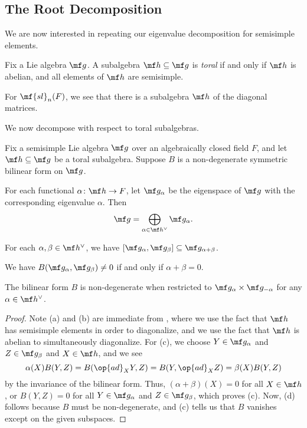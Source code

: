 \documentclass[../notes.tex]{subfiles}
\begin{document}
\subsection{The Root Decomposition}
We are now interested in repeating our eigenvalue decomposition for semisimple elements.
\begin{definition}[toral]
	Fix a Lie algebra $\mf g$. A subalgebra $\mf h\subseteq\mf g$ is \textit{toral} if and only if $\mf h$ is abelian, and all elements of $\mf h$ are semisimple.
\end{definition}
\begin{example}
	For $\mf{sl}_n(F)$, we see that there is a subalgebra $\mf h$ of the diagonal matrices.
\end{example}
We now decompose with respect to toral subalgebras.
\begin{proposition} \label{prop:toral-root-decomposition}
	Fix a semisimple Lie algebra $\mf g$ over an algebraically closed field $F$, and let $\mf h\subseteq\mf g$ be a toral subalgebra. Suppose $B$ is a non-degenerate symmetric bilinear form on $\mf g$.
	\begin{listalph}
		\item For each functional $\alpha\colon\mf h\to F$, let $\mf g_\alpha$ be the eigenspace of $\mf g$ with the corresponding eigenvalue $\alpha$. Then
		\[\mf g=\bigoplus_{\alpha\in\mf h^\lor}\mf g_\alpha.\]
		\item For each $\alpha,\beta\in\mf h^\lor$, we have $[\mf g_\alpha,\mf g_\beta]\subseteq\mf g_{\alpha+\beta}$.
		\item We have $B(\mf g_\alpha,\mf g_\beta)\ne0$ if and only if $\alpha+\beta=0$.
		\item The bilinear form $B$ is non-degenerate when restricted to $\mf g_\alpha\times\mf g_{-\alpha}$ for any $\alpha\in\mf h^\lor$.
	\end{listalph}
\end{proposition}
\begin{proof}
	Note (a) and (b) are immediate from , where we use the fact that $\mf h$ has semisimple elements in order to diagonalize, and we use the fact that $\mf h$ is abelian to simultaneously diagonalize. For (c), we choose $Y\in\mf g_\alpha$ and $Z\in\mf g_\beta$ and $X\in\mf h$, and we see
	\[\alpha(X)B(Y,Z)=B(\op{ad}_XY,Z)=B(Y,\op{ad}_XZ)=\beta(X)B(Y,Z)\]
	by the invariance of the bilinear form. Thus, $(\alpha+\beta)(X)=0$ for all $X\in\mf h$, or $B(Y,Z)=0$ for all $Y\in\mf g_\alpha$ and $Z\in\mf g_\beta$, which proves (c). Now, (d) follows because $B$ must be non-degenerate, and (c) tells us that $B$ vanishes except on the given subspaces.
\end{proof}
\end{document}
